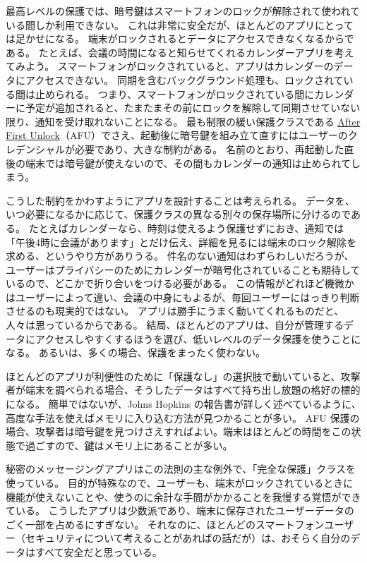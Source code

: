 \documentclass[uplatex]{jsarticle}
\begin{document}
最高レベルの保護では、暗号鍵はスマートフォンのロックが解除されて使われている間しか利用できない。
これは非常に安全だが、ほとんどのアプリにとっては足かせになる。
端末がロックされるとデータにアクセスできなくなるからである。
たとえば、会議の時間になると知らせてくれるカレンダーアプリを考えてみよう。
スマートフォンがロックされていると、アプリはカレンダーのデータにアクセスできない。
同期を含むバックグラウンド処理も、ロックされている間は止められる。
つまり、スマートフォンがロックされている間にカレンダーに予定が追加されると、たまたまその前にロックを解除して同期させていない限り、通知を受け取れないことになる。
最も制限の緩い保護クラスである \underline{After First Unlock}（AFU）でさえ、起動後に暗号鍵を組み立て直すにはユーザーのクレデンシャルが必要であり、大きな制約がある。
名前のとおり、再起動した直後の端末では暗号鍵が使えないので、その間もカレンダーの通知は止められてしまう。

こうした制約をかわすようにアプリを設計することは考えられる。
データを、いつ必要になるかに応じて、保護クラスの異なる別々の保存場所に分けるのである。
たとえばカレンダーなら、時刻は使えるよう保護せずにおき、通知では「午後4時に会議があります」とだけ伝え、詳細を見るには端末のロック解除を求める、というやり方がありうる。
件名のない通知はわずらわしいだろうが、ユーザーはプライバシーのためにカレンダーが暗号化されていることも期待しているので、どこかで折り合いをつける必要がある。
この情報がどれほど機微かはユーザーによって違い、会議の中身にもよるが、毎回ユーザーにはっきり判断させるのも現実的ではない。
アプリは勝手にうまく動いてくれるものだと、人々は思っているからである。
結局、ほとんどのアプリは、自分が管理するデータにアクセスしやすくするほうを選び、低いレベルのデータ保護を使うことになる。
あるいは、多くの場合、保護をまったく使わない。

ほとんどのアプリが利便性のために「保護なし」の選択肢で動いていると、攻撃者が端末を調べられる場合、そうしたデータはすべて持ち出し放題の格好の標的になる。
簡単ではないが、Johns Hopkins の報告書が詳しく述べているように、高度な手法を使えばメモリに入り込む方法が見つかることが多い。
AFU 保護の場合、攻撃者は暗号鍵を見つけさえすればよい。端末はほとんどの時間をこの状態で過ごすので、鍵はメモリ上にあることが多い。

秘密のメッセージングアプリはこの法則の主な例外で、「完全な保護」クラスを使っている。
目的が特殊なので、ユーザーも、端末がロックされているときに機能が使えないことや、使うのに余計な手間がかかることを我慢する覚悟ができている。
こうしたアプリは少数派であり、端末に保存されたユーザーデータのごく一部を占めるにすぎない。
それなのに、ほとんどのスマートフォンユーザー（セキュリティについて考えることがあればの話だが）は、おそらく自分のデータはすべて安全だと思っている。
\end{document}
